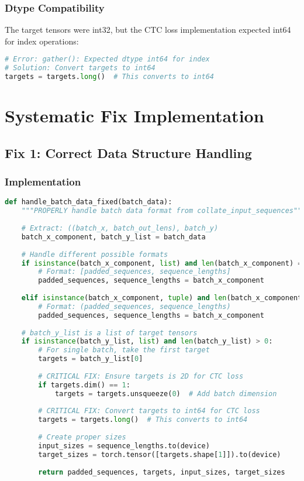 \documentclass[11pt,a4paper]{article}
\begin{document}
\subsubsection{Dtype Compatibility}
The target tensors were int32, but the CTC loss implementation expected int64 for index operations:

\begin{lstlisting}[language=Python, caption=Dtype Analysis]
# Error: gather(): Expected dtype int64 for index
# Solution: Convert targets to int64
targets = targets.long()  # This converts to int64
\end{lstlisting}

\section{Systematic Fix Implementation}

\subsection{Fix 1: Correct Data Structure Handling}

\subsubsection{Implementation}
\begin{lstlisting}[language=Python, caption=Fixed Data Handling Function]
def handle_batch_data_fixed(batch_data):
    """PROPERLY handle batch data format from collate_input_sequences"""
    
    # Extract: ((batch_x, batch_out_lens), batch_y)
    batch_x_component, batch_y_list = batch_data
    
    # Handle different possible formats
    if isinstance(batch_x_component, list) and len(batch_x_component) == 2:
        # Format: [padded_sequences, sequence_lengths]
        padded_sequences, sequence_lengths = batch_x_component
        
    elif isinstance(batch_x_component, tuple) and len(batch_x_component) == 2:
        # Format: (padded_sequences, sequence_lengths)
        padded_sequences, sequence_lengths = batch_x_component
        
    # batch_y_list is a list of target tensors
    if isinstance(batch_y_list, list) and len(batch_y_list) > 0:
        # For single batch, take the first target
        targets = batch_y_list[0]
        
        # CRITICAL FIX: Ensure targets is 2D for CTC loss
        if targets.dim() == 1:
            targets = targets.unsqueeze(0)  # Add batch dimension
        
        # CRITICAL FIX: Convert targets to int64 for CTC loss
        targets = targets.long()  # This converts to int64
        
        # Create proper sizes
        input_sizes = sequence_lengths.to(device)
        target_sizes = torch.tensor([targets.shape[1]]).to(device)
        
        return padded_sequences, targets, input_sizes, target_sizes
\end{lstlisting}
\end{document}
